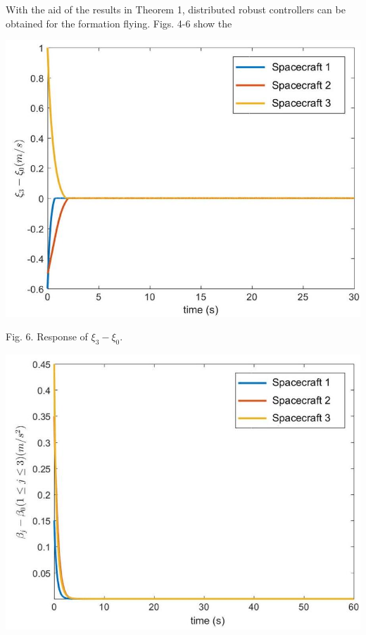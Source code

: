 \documentclass[10pt]{article}
\begin{document}
With the aid of the results in Theorem 1, distributed robust controllers can be obtained for the formation flying. Figs. 4-6 show the

\begin{center}
\includegraphics[max width=\textwidth]{2023_10_07_a50fd94fd281fe9896c1g-08(1)}
\end{center}

Fig. 6. Response of $\xi_{3}-\xi_{0}$.

\begin{center}
\includegraphics[max width=\textwidth]{2023_10_07_a50fd94fd281fe9896c1g-08(4)}
\end{center}
\end{document}

